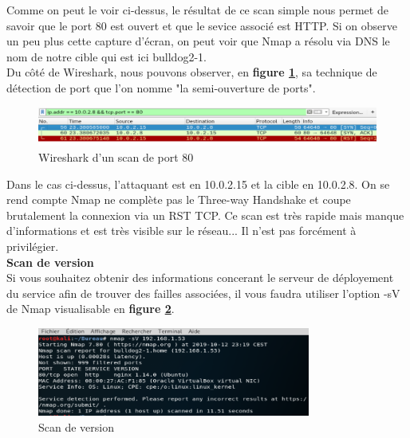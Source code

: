 Comme on peut le voir ci-dessus, le résultat de ce scan simple nous permet de savoir que le port 80 est ouvert et que le sevice associé est HTTP. Si on observe un peu plus cette capture d'écran, on peut voir que Nmap a résolu via DNS le nom de notre cible qui est ici bulldog2-1.\\
Du côté de Wireshark, nous pouvons observer, en \textbf{figure \ref{fig:wirebasique}}, sa technique de détection de port que l'on nomme "la semi-ouverture de ports".

\begin{figure}[htp!]
  \centering
  \setlength\figureheight{7cm}
  \setlength\figurewidth{9cm}
  \includegraphics[width=1\textwidth]{oui/images/nmap/Wirebasique.PNG}
  \caption{Wireshark d'un scan de port 80}
  \label{fig:wirebasique}
\end{figure}

Dans le cas ci-dessus, l'attaquant est en 10.0.2.15 et la cible en 10.0.2.8. On se rend compte Nmap ne complète pas le Three-way Handshake et coupe brutalement la connexion via un RST TCP.
Ce scan est très rapide mais manque d'informations et est très visible sur le réseau... Il n'est pas forcément à privilégier.\\

\noindent \textbf{Scan de version}\\

Si vous souhaitez obtenir des informations concerant le serveur de déployement du service afin de trouver des failles associées, il vous faudra utiliser l'option -sV de Nmap visualisable en \textbf{figure \ref{fig:sv}}.

\begin{figure}[htp!]
  \centering
  \setlength\figureheight{7cm}
  \setlength\figurewidth{9cm}
  \includegraphics[width=0.8\textwidth]{oui/Ancien/imangeancien/Nmap/-sV.PNG}
  \caption{Scan de version}
  \label{fig:sv}
\end{figure}


